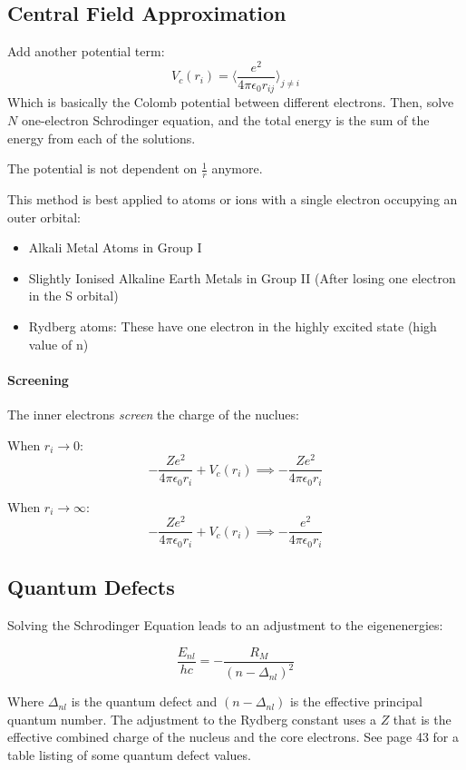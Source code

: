 \documentclass[12pt]{article}
\begin{document}
\subsection{Central Field Approximation}
Add another potential term:
\[ V_c(r_i) = \langle \frac{e^2}{4\pi\epsilon_0 r_{ij}}\rangle_{j\neq i}\]
Which is basically the Colomb potential between different electrons. Then, solve $N$ one-electron Schrodinger equation, and the total energy is the sum of the energy from each of the solutions. 

The potential is not dependent on $\frac{1}{r}$ anymore.

This method is best applied to atoms or ions with a single electron occupying an outer orbital:
\begin{itemize}
    \item Alkali Metal Atoms in Group I
    \item Slightly Ionised Alkaline Earth Metals in Group II (After losing one electron in the S orbital)
    \item Rydberg atoms: These have one electron in the highly excited state (high value of n)
\end{itemize}

\paragraph{Screening}
The inner electrons \textit{screen} the charge of the nuclues:

When $r_i \to 0$:
\[ -\frac{Ze^2}{4\pi\epsilon_0 r_i} + V_c(r_i) \implies -\frac{Ze^2}{4\pi\epsilon_0 r_i}\]

When $r_i \to \infty$:
\[ -\frac{Ze^2}{4\pi\epsilon_0 r_i} + V_c(r_i) \implies -\frac{e^2}{4\pi\epsilon_0 r_i}\]

\subsection{Quantum Defects}

Solving the Schrodinger Equation leads to an adjustment to the eigenenergies:

\[\frac{E_{nl}}{hc} = -\frac{R_M}{(n-\Delta_{nl})^2}\]

Where $\Delta_{nl}$ is the quantum defect and $(n-\Delta_{nl})$ is the effective principal quantum number. The adjustment to the Rydberg constant uses a $Z$ that is the effective combined charge of the nucleus and the core electrons. See page 43 for a table listing of some quantum defect values.
\end{document}
